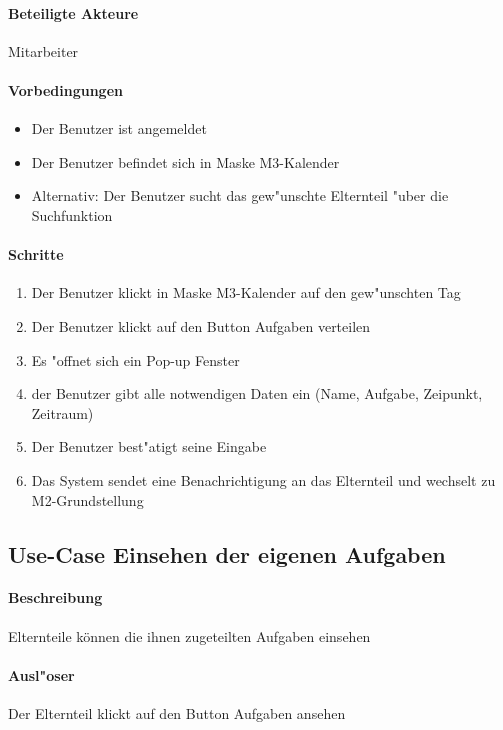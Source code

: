   \paragraph{Beteiligte Akteure}   \leavevmode \newline
    Mitarbeiter
  \paragraph{Vorbedingungen}
  \begin{itemize}
   \item Der Benutzer ist angemeldet
   \item Der Benutzer befindet sich in Maske M3-Kalender
   \item Alternativ: Der Benutzer sucht das gew"unschte Elternteil "uber die Suchfunktion
  \end{itemize}

  \paragraph{Schritte}
  \begin{enumerate}
  \item Der Benutzer klickt in Maske M3-Kalender auf den gew"unschten Tag
  \item Der Benutzer klickt auf den Button \dq Aufgaben verteilen\dq
  \item Es "offnet sich ein Pop-up Fenster
  \item der Benutzer gibt alle notwendigen Daten ein (Name, Aufgabe, Zeipunkt, Zeitraum)
  \item Der Benutzer best"atigt seine Eingabe
  \item Das System sendet eine Benachrichtigung an das Elternteil und wechselt zu M2-Grundstellung
  \end{enumerate}
  
  
  
  
	\newpage
	\subsection{Use-Case Einsehen der eigenen Aufgaben}
	\paragraph{Beschreibung}
	Elternteile können die ihnen zugeteilten Aufgaben einsehen 
	\paragraph{Ausl"oser}
	Der Elternteil klickt auf den Button \dq Aufgaben ansehen\dq
